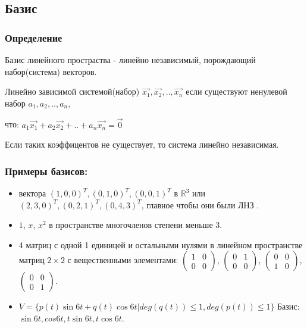 \documentclass[12pt]{article}
\begin{document}
\subsection{Базис}
\subsubsection{Определение}
Базис линейного простраства - линейно независимый, порождающий набор(система) векторов.\par
Линейно зависимой системой(набор) $\overrightarrow{x_1},\overrightarrow{ x_2},..,\overrightarrow{x_n}$ если существуют ненулевой набор $a_1,a_2,..,a_n$,\par что: $a_1\overrightarrow{x_1}+a_2\overrightarrow{ x_2}+..+a_n\overrightarrow{x_n}=\overrightarrow{0}$ \par Если таких коэффицентов не существует, то система линейно независимая.\\
\subsubsection{Примеры базисов:}
\begin{itemize}
    \item вектора $(1,0,0)^T,(0,1,0)^T,(0,0,1)^T$ в $\mathbb{R}^3$ или $(2,3,0)^T,(0,2,1)^T,(0,4,3)^T$, главное чтобы они были ЛНЗ .
    \item $1$, $x$, $x^2$ в пространстве многочленов степени меньше 3.
    \item 4 матриц с одной 1 единицей и остальными нулями в линейном пространстве матриц $2 \times 2$ с вещественными элементами:
          $\begin{pmatrix}
                  1 & 0 \\
                  0 & 0
              \end{pmatrix}$,
          $\begin{pmatrix}
                  0 & 1 \\
                  0 & 0
              \end{pmatrix}$,
          $\begin{pmatrix}
                  0 & 0 \\
                  1 & 0
              \end{pmatrix}$,
          $\begin{pmatrix}
                  0 & 0 \\
                  0 & 1
              \end{pmatrix}$.
    \item $V =\{p(t)\sin{6t}+q(t)\cos{6t} \vert deg(q(t))\leq 1, deg(p(t))\leq 1\}$ Базис: $\sin{6t},cos{6t},t\sin{6t},t\cos{6t}$.
\end{itemize}
\end{document}
